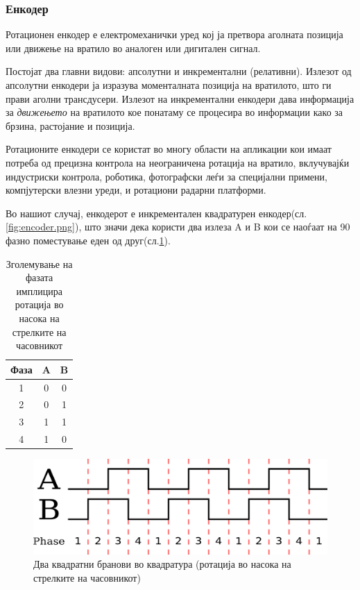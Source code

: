 \documentclass[12pt]{article}
\begin{document}
    \subsubsection{Енкодер}
      Ротационен енкодер е електромеханички уред кој ја претвора аголната позиција или движење на вратило во аналоген или дигитален сигнал.

		  Постојат два главни видови: апсолутни и инкрементални (релативни). Излезот од апсолутни енкодери ја изразува моменталната позиција на вратилото, што ги прави аголни трансдусери. Излезот на инкрементални енкодери дава информација за \textit{движењето} на вратилото кое понатаму се процесира во информации како за брзина, растојание и позиција.

		  Ротационите енкодери се користат во многу области на апликации кои имаат потреба од прецизна контрола на неограничена ротација на вратило, вклучувајќи индустриски контрола, роботика, фотографски леѓи за специјални примени, компјутерски влезни уреди, и ротациони радарни платформи.

		  Во нашиот случај, енкодерот е инкрементален квадратурен енкодер(сл.\ref{fig:encoder.png}), што значи дека користи два излеза A и B кои се наоѓаат на 90 \degree фазно поместување еден од друг(сл.\ref{fig:encoder_quadrature.png}).

		  \begin{table}[h]
        \caption{Зголемување на фазата имплицира ротација во насока на стрелките на часовникот}
        \label{tab:fazno}
        \begin{center}
          \begin{tabular}{||c|c|c||}
            \hline
            Фаза & A & B \\
            \hline \hline
            1 & 0 & 0 \\
            \hline
					  2 & 0 & 1 \\
            \hline
            3 & 1 & 1 \\
            \hline
            4 & 1 & 0 \\
            \hline
            \end{tabular}
          \end{center}
        \end{table}

      \begin{figure}[H]
        \includegraphics[width=0.5\linewidth]{./images/encoder_quadrature.png}
        \centering
        \caption{Два квадратни бранови во квадратура (ротација во насока на стрелките на часовникот)}
        \label{fig:encoder_quadrature.png}
        \end{figure}
\end{document}
